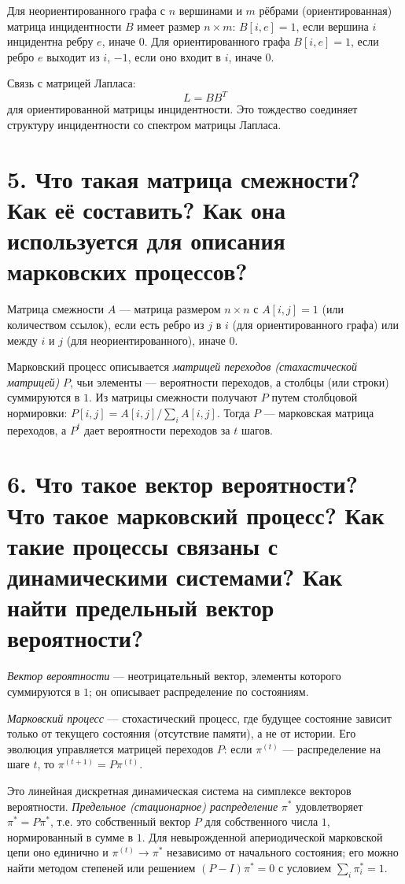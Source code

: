 \documentclass[12pt,a4paper]{article}
\begin{document}
Для неориентированного графа с $n$ вершинами и $m$ рёбрами (ориентированная) матрица инцидентности $B$ имеет размер $n\times m$: $B[i,e]=1$, если вершина $i$ инцидентна ребру $e$, иначе $0$. Для ориентированного графа $B[i,e]=1$, если ребро $e$ выходит из $i$, $-1$, если оно входит в $i$, иначе $0$.

Связь с матрицей Лапласа:
\[
L = B B^{T}
\]
для ориентированной матрицы инцидентности. Это тождество соединяет структуру инцидентности со спектром матрицы Лапласа.

\section*{5. Что такая матрица смежности? Как её составить? Как она используется для описания марковских процессов?}

Матрица смежности $A$ --- матрица размером $n\times n$ с $A[i,j]=1$ (или количеством ссылок), если есть ребро из $j$ в $i$ (для ориентированного графа) или между $i$ и $j$ (для неориентированного), иначе $0$.

Марковский процесс описывается \emph{матрицей переходов (стахастической матрицей)} $P$, чьи элементы --- вероятности переходов, а столбцы (или строки) суммируются в $1$. Из матрицы смежности получают $P$ путем столбцовой нормировки: $P[i,j]=A[i,j]/\sum_i A[i,j]$. Тогда $P$ --- марковская матрица переходов, а $P^{t}$ дает вероятности переходов за $t$ шагов.

\section*{6. Что такое вектор вероятности? Что такое марковский процесс? Как такие процессы связаны с динамическими системами? Как найти предельный вектор вероятности?}

\emph{Вектор вероятности} --- неотрицательный вектор, элементы которого суммируются в $1$; он описывает распределение по состояниям.

\emph{Марковский процесс} --- стохастический процесс, где будущее состояние зависит только от текущего состояния (отсутствие памяти), а не от истории. Его эволюция управляется матрицей переходов $P$: если $\pi^{(t)}$ --- распределение на шаге $t$, то $\pi^{(t+1)}=P\pi^{(t)}$.

Это линейная дискретная динамическая система на симплексе векторов вероятности. \emph{Предельное (стационарное) распределение} $\pi^*$ удовлетворяет $\pi^*=P\pi^*$, т.е. это собственный вектор $P$ для собственного числа $1$, нормированный в сумме в $1$. Для невырожденной апериодической марковской цепи оно единично и $\pi^{(t)}\to\pi^*$ независимо от начального состояния; его можно найти методом степеней или решением $(P-I)\pi^*=0$ с условием $\sum_i\pi^*_i=1$.
\end{document}
